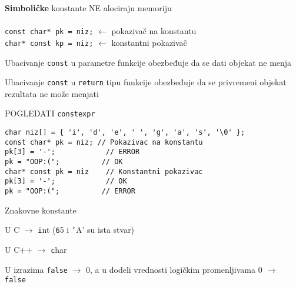 \documentclass{article}
\newenvironment{xitemize}{%
    
    \itemize
    \larger
}{%
    \enditemize
}
\let\olditemize\itemize
\let\endolditemize\enditemize
\renewenvironment{itemize}{%
    \smaller
    \olditemize
}{%
    \endolditemize
}
\providecommand{\inlinecode}[1]{\texttt{#1}}
\begin{document}
\begin{xitemize}
\begin{itemize}
    \item \textbf{Simboličke }konstante NE alociraju memoriju
    \\\\
    \inlinecode{const char* pk = niz;} $\longleftarrow$ pokazivač na konstantu\\
    \inlinecode{char* const kp = niz;} $\longleftarrow$ konstantni pokazivač
    \item Ubacivanje \inlinecode{const} u parametre funkcije obezbeđuje da se dati objekat ne menja
    \item Ubacivanje \inlinecode{const} u \inlinecode{return} tipu funkcije obezbeđuje da se privremeni objekat rezultata ne može menjati
    \item POGLEDATI \inlinecode{constexpr}
    \begin{lstlisting}
char niz[] = { 'i', 'd', 'e', ' ', 'g', 'a', 's', '\0' };
const char* pk = niz; // Pokazivac na konstantu
pk[3] = '-';            // ERROR
pk = "OOP:(";          // OK
char* const pk = niz    // Konstantni pokazivac
pk[3] = '-';            // OK
pk = "OOP:(";          // ERROR
    \end{lstlisting}
\end{itemize}
\item Znakovne konstante
\begin{itemize}
    \item U C $\rightarrow$ \inlinecode int (\inlinecode 65 i \inlinecode 'A' su ista stvar)
    \item U C++ $\rightarrow$ \inlinecode char
    \item U izrazima \inlinecode{false} $\rightarrow$ 0, a u dodeli vrednosti logičkim promenljivama 0 $\rightarrow$ \inlinecode{false}
\end{itemize}
\newpage


\end{xitemize}
\end{document}
